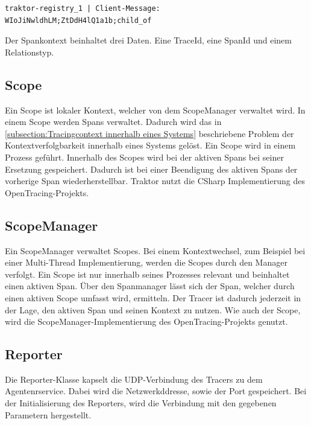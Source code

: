 \begin{minipage}[]{\textwidth}
	\begin{lstlisting}[frame=trBL]
	traktor-registry_1 | Client-Message: WIoJiNwldhLM;ZtDdH4lQ1a1b;child_of
	\end{lstlisting}
	\label{listing:SpanContext-Registry}
\end{minipage} 

Der Spankontext beinhaltet drei Daten. Eine TraceId, eine SpanId und einem Relationstyp.

\subsection{Scope}
\label{subsection:Scope}

Ein Scope ist lokaler Kontext, welcher von dem ScopeManager verwaltet wird. In einem Scope werden Spans verwaltet. Dadurch wird das in \cref{subsection:Tracingcontext innerhalb eines Systems} beschriebene Problem der Kontextverfolgbarkeit innerhalb eines Systems gelöst. Ein Scope wird in einem Prozess geführt. Innerhalb des Scopes wird bei der aktiven Spans bei seiner Ersetzung gespeichert. Dadurch ist bei einer Beendigung des aktiven Spans der vorherige Span wiederherstellbar. Traktor nutzt die CSharp Implementierung des OpenTracing-Projekts.

\subsection{ScopeManager}
\label{subsection:SpanManager}
Ein ScopeManager verwaltet Scopes. Bei einem Kontextwechsel, zum Beispiel bei einer Multi-Thread Implementierung, werden die Scopes durch den Manager verfolgt. Ein Scope ist nur innerhalb seines Prozesses relevant und beinhaltet einen aktiven Span. Über den Spanmanager lässt sich der Span, welcher durch einen aktiven Scope umfasst wird, ermitteln. Der Tracer ist dadurch jederzeit in der Lage, den aktiven Span und seinen Kontext zu nutzen. Wie auch der Scope, wird die ScopeManager-Implementierung des OpenTracing-Projekts genutzt. 

\subsection{Reporter}
\label{subsection:Reporter}
Die Reporter-Klasse kapselt die UDP-Verbindung des Tracers zu dem Agentenrservice. Dabei wird die Netzwerkddresse, sowie der Port gespeichert. Bei der Initialisierung des Reporters, wird die Verbindung mit den gegebenen Parametern hergestellt.

